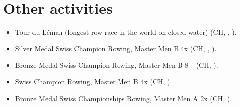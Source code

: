 \documentclass[
    bibsize = normalsize,
    bibpackage = none,
    paragraphshape = display,
    paragraphafter = none,
]{goose-article}
\begin{document}
\section*{Other activities}

\begin{itemize}
    \itemsep0em
    \item Tour du L\'{e}man (longest row race in the world on closed water) (CH, \MyDateTdLA, \MyDateTdLB).
    \item Silver Medal Swiss Champion Rowing, Master Men B 4x (CH, \MyDateChampionSuisseC, \MyDateChampionSuisseD).
    \item Bronze Medal Swiss Champion Rowing, Master Men B 8+ (CH, \MyDateChampionSuisseC).
    \item Swiss Champion Rowing, Master Men B 4x (CH, \MyDateChampionSuisseB).
    \item Bronze Medal Swiss Championships Rowing, Master Men A 2x (CH, \MyDateChampionSuisseA).
\end{itemize}
\end{document}
